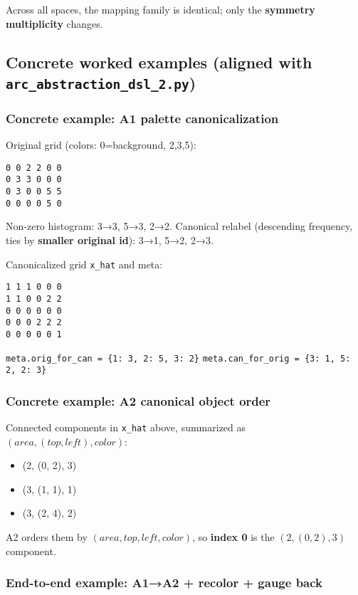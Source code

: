 \documentclass[11pt]{article}
\newcommand{\code}[1]{\texttt{#1}}
\begin{document}
Across all spaces, the mapping family is identical; only the \textbf{symmetry multiplicity} changes.

\subsection{Concrete worked examples (aligned with \code{arc\_abstraction\_dsl\_2.py})}

\subsubsection{Concrete example: A1 palette canonicalization}

Original grid (colors: 0=background, 2,3,5):

\begin{lstlisting}
0 0 2 2 0 0
0 3 3 0 0 0
0 3 0 0 5 5
0 0 0 0 5 0
\end{lstlisting}

Non-zero histogram: 3→3, 5→3, 2→2.  
Canonical relabel (descending frequency, ties by \textbf{smaller original id}): 3→1, 5→2, 2→3.

Canonicalized grid \code{x\_hat} and meta:

\begin{lstlisting}
1 1 1 0 0 0
1 1 0 0 2 2
0 0 0 0 0 0
0 0 0 2 2 2
0 0 0 0 0 1
\end{lstlisting}

\code{meta.orig\_for\_can = \{1: 3, 2: 5, 3: 2\}}  
\code{meta.can\_for\_orig = \{3: 1, 5: 2, 2: 3\}}

\subsubsection{Concrete example: A2 canonical object order}

Connected components in \code{x\_hat} above, summarized as $(area, (top,left), color)$:

\begin{itemize}
\item (2, (0, 2), 3)
\item (3, (1, 1), 1)
\item (3, (2, 4), 2)
\end{itemize}

A2 orders them by $(area, top, left, color)$, so \textbf{index 0} is the $(2, (0,2), 3)$ component.

\subsubsection{End-to-end example: A1→A2 + recolor + gauge back}
\end{document}
